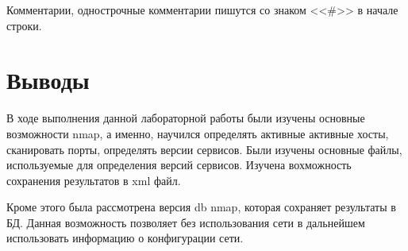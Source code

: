 \documentclass[utf8x, 12pt]{G7-32}
\begin{document}
Комментарии, однострочные комментарии пишутся со знаком <<\#>> в начале строки.



\chapter{Выводы}

В ходе выполнения данной лабораторной работы были изучены основные возможности nmap, а именно, научился определять активные активные хосты, сканировать порты, определять версии сервисов. Были изучены основные файлы, используемые для определения версий сервисов. Изучена вохможность сохранения результатов в xml файл.

Кроме этого была рассмотрена версия db nmap, которая сохраняет результаты в БД. Данная возможность позволяет без использования сети в дальнейшем использовать информацию о конфигурации сети.
\end{document}
